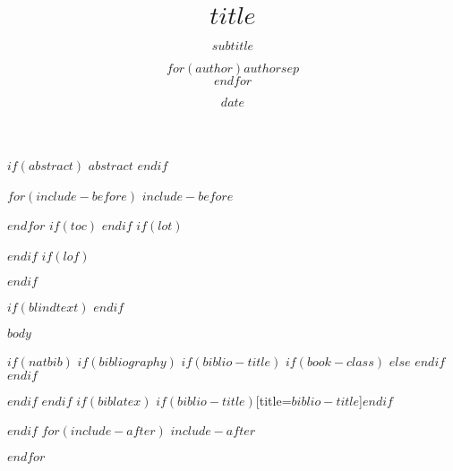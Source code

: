 \documentclass[twoside, 12pt]{article}
\title{\textbf{\Large{\sffamily $title$}}}
\title{}
\subtitle{$subtitle$}
\author{$for(author)$$author$$sep$ \\ $endfor$}
\author{}
\date{$date$}
\date{}
\begin{document}
\maketitle
\thispagestyle{fancy}

$if(abstract)$
\noindent
$abstract$
$endif$

$for(include-before)$
$include-before$

$endfor$
$if(toc)$
{
\hypersetup{linkcolor=$if(toccolor)$$toccolor$$else$black$endif$}
\setcounter{tocdepth}{$toc-depth$}
\tableofcontents
}
$endif$
$if(lot)$
\listoftables
$endif$
$if(lof)$
\listoffigures
$endif$

$if(blindtext)$
\Blinddocument
$endif$

\noindent
$body$


$if(natbib)$
$if(bibliography)$
$if(biblio-title)$
$if(book-class)$
\renewcommand\bibname{$biblio-title$}
$else$
\renewcommand\refname{$biblio-title$}
$endif$
$endif$


$endif$
$endif$
$if(biblatex)$
\printbibliography$if(biblio-title)$[title=$biblio-title$]$endif$

$endif$
$for(include-after)$
$include-after$

$endfor$
\end{document}
